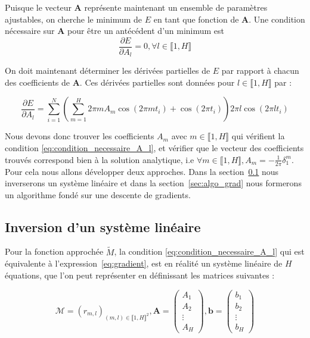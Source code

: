 \documentclass[12pt]{report}
\begin{document}
Puisque le vecteur $\bm{A}$ représente maintenant un ensemble de paramètres ajustables, on cherche le minimum de $E$ en tant que fonction de $\bm{A}$.
Une condition nécessaire sur $\bm{A}$ pour être un antécédent d'un minimum est
\begin{equation}
    \frac{\partial E}{\partial A_l} = 0, {\forall l \in\llbracket 1,H \rrbracket}
    \label{eq:condition_necessaire_A_l}
\end{equation}

On doit maintenant déterminer les dérivées partielles de $E$ par rapport à chacun des coefficients de $\bm{A}$.
Ces dérivées partielles sont données pour $l \in \llbracket 1,H \rrbracket$ par :

\begin{equation}
    \frac{\partial E}{\partial A_l} =
    \sum_{i=1}^{N}(\sum_{m=1}^{H} 2\pi m A_m \cos(2\pi m t_i)+\cos(2\pi t_i))
    2\pi l \cos(2\pi l t_i)
    \label{eq:gradient}
\end{equation}

Nous devons donc trouver les coefficients $A_m$ avec ${m\in \llbracket 1,H \rrbracket}$ qui vérifient la condition \ref{eq:condition_necessaire_A_l}, et vérifier que le vecteur des coefficients trouvés correspond bien à la solution analytique, i.e $\forall m \in\llbracket 1,H \rrbracket, A_m = -\frac{1}{2\pi}\delta_1^m$.
Pour cela nous allons développer deux approches.
Dans la section~\ref{sec:inversion_sys_lin} nous inverserons un système linéaire et dans la section~\ref{sec:algo_grad} nous formerons un algorithme fondé sur une descente de gradients.

\subsection{Inversion d'un système linéaire}
\label{sec:inversion_sys_lin}

Pour la fonction approchée $\tilde{M}$, la condition \ref{eq:condition_necessaire_A_l} qui est équivalente à l'expression~\ref{eq:gradient}, est en réalité un système linéaire de $H$ équations, que l'on peut représenter en définissant les matrices suivantes :

\begin{equation}
    \mathcal{M} = (r_{m,l})_{(m,l)\in \llbracket 1, H\rrbracket ^2},
    \bm{A} = \begin{pmatrix}
        A_1    \\
        A_2    \\
        \vdots \\
        A_H
    \end{pmatrix},
    \bm{b} = \begin{pmatrix}
        b_1    \\
        b_2    \\
        \vdots \\
        b_H
    \end{pmatrix}
    \label{eq:definition_notation}
\end{equation}
\end{document}

